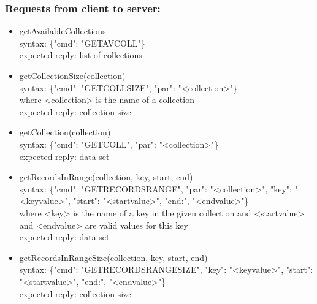 \documentclass[oneside, english, final]{design}
\begin{document}
\subsubsection{Requests from client to server:}
\begin{itemize}
\item{getAvailableCollections}
\\
syntax: \{"cmd": "GETAVCOLL"\} \\
expected reply: list of collections

\item{getCollectionSize(collection)}
\\
syntax: \{"cmd": "GETCOLLSIZE", "par": "<collection>"\} \\
where <collection> is the name of a collection\\
expected reply: collection size
       
\item{getCollection(collection)}
\\
syntax: \{"cmd": "GETCOLL", "par": "<collection>"\} \\
expected reply: data set

\item{getRecordsInRange(collection, key, start, end)}
\\
syntax: \{"cmd": "GETRECORDSRANGE", "par": "<collection>", "key": "<keyvalue>", "start": "<startvalue>", "end:", "<endvalue>"\} \\
where <key> is the name of a key in the given collection and <startvalue> and <endvalue> are valid values for this key\\
expected reply: data set

\item{getRecordsInRangeSize(collection, key, start, end)}
\\
syntax: \{"cmd": "GETRECORDSRANGESIZE", "key": "<keyvalue>", "start": "<startvalue>", "end:", "<endvalue>"\} \\
expected reply: collection size

\end{itemize}
\end{document}

